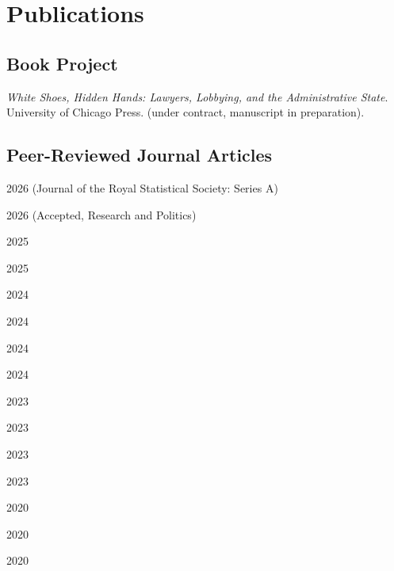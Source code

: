 \documentclass[12pt,letterpaper]{report}
\newcounter{pubcount}
\newcommand{\countthis}{%
}
\begin{document}
    \section*{Publications}

	
	\subsection*{Book Project}
	\textit{White Shoes, Hidden Hands: Lawyers, Lobbying, and the Administrative State}. University of Chicago Press. (under contract, manuscript in preparation). 
 
    \subsection*{Peer-Reviewed Journal Articles}
    \begin{tablist}
    \item[2026] \tab{}  (Journal of the Royal Statistical Society: Series A)
    \item[2026]\tab{} (Accepted, Research and Politics)
    \item[2025] \tab{}
    \item[2025] \tab{}\countthis{}
    \item[2024] \tab{}\countthis{}
    \item[2024] \tab{}\countthis{}
    \item[2024] \tab{}\countthis{}
    \item[2024] \tab{}\countthis{}
    \item[2023] \tab{}\countthis{}
    \item[2023]	\tab{}\countthis{}
    \item[2023] \tab{}\countthis{}
    \item[2023] \tab{}\countthis{}
    \item[2020] \tab{}\countthis{}
    \item[2020] \tab{}\countthis{}
    \item[2020] \tab{}\countthis{}
    \end{tablist}
    
\end{document}
